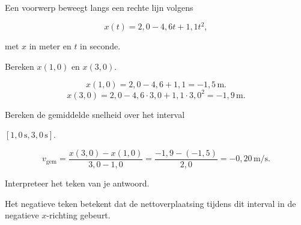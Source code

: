 \documentclass{ximera}
\begin{document}
\begin{oefening}{\oefB\ESS}

Een voorwerp beweegt langs een rechte lijn volgens

\[x(t)=2,0-4,6t+1,1t^2,\]

met $x$ in meter en $t$ in seconde.

\begin{question}

Bereken $x(1,0)$ en $x(3,0)$.

\begin{oplossing}
\[x(1,0)=2,0-4,6+1,1=-1,5\,\mathrm{m}.\]
\[x(3,0)=2,0-4,6\cdot3,0+1,1\cdot3,0^2=-1,9\,\mathrm{m}.\]
\end{oplossing}

\end{question}

\begin{question}

Bereken de gemiddelde snelheid over het interval

$[1,0\,\mathrm{s},3,0\,\mathrm{s}]$.

\begin{oplossing}
\[v_{\mathrm{gem}}=\frac{x(3,0)-x(1,0)}{3,0-1,0} =\frac{-1,9-(-1,5)}{2,0} =-0,20\,\mathrm{m/s}.\]
\end{oplossing}

\end{question}

\begin{question}

Interpreteer het teken van je antwoord.

\begin{oplossing}
Het negatieve teken betekent dat de nettoverplaatsing tijdens dit interval in de negatieve \(x\)-richting gebeurt.
\end{oplossing}

\end{question}

\end{oefening}
\end{document}
